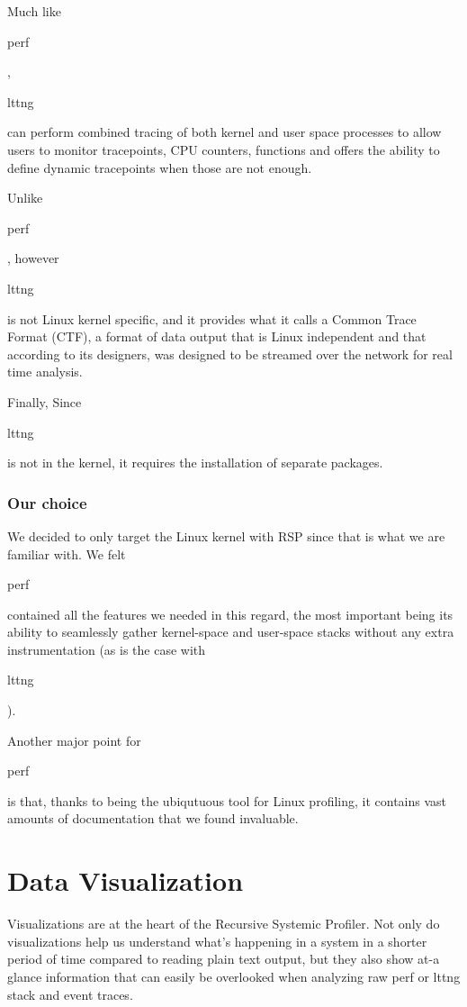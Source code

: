 \documentclass[10pt]{article}
\begin{document}
Much like \begin{tt}perf\end{tt}, \begin{tt}lttng\end{tt} can perform combined
tracing of both kernel and user space processes to allow users to monitor
tracepoints, CPU counters, functions and offers the ability to define
dynamic tracepoints when those are not enough.

Unlike \begin{tt}perf\end{tt}, however \begin{tt}lttng\end{tt} is not Linux
kernel specific, and it provides what it calls a Common Trace Format (CTF),
a format of data output that is Linux independent and that according to its
designers, was designed to be streamed over the network for real time
analysis.

Finally, Since \begin{tt}lttng\end{tt} is not in the kernel, it requires the
installation of separate packages.

\subsubsection{Our choice}

We decided to only target the Linux kernel with RSP since that is what we are
familiar with. We felt \begin{tt}perf\end{tt} contained all the features we
needed in this regard, the most important being its ability to
seamlessly gather kernel-space and user-space stacks without any extra
instrumentation (as is the case with \begin{tt}lttng\end{tt}).

Another major point for \begin{tt}perf\end{tt} is that, thanks to being the
ubiqutuous tool for Linux profiling, it contains vast amounts of
documentation that we found invaluable.

\section{Data Visualization}

Visualizations are at the heart of the Recursive Systemic Profiler. Not only do
visualizations help us understand what's happening in a system in a shorter
period of time compared to reading plain text output, but they also show at-a
glance information that can easily be overlooked when analyzing raw perf or lttng
stack and event traces.
\end{document}
